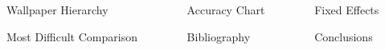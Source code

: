\documentclass[final,hyperref={pdfpagelabels=false}]{beamer}
\begin{document}
\begin{frame}{}
\begin{columns}[t]
    \end{columns}
    \begin{columns}[t]
       \begin{column}{.31\linewidth}
       \begin{block}{Wallpaper Hierarchy}
               	      		 	
               	       		\end{block}
               	       		\begin{block}{Most Difficult Comparison}
               	       		      			
               	       		      		\end{block}
       \end{column}
       	\begin{column}{.40\linewidth}
       		\begin{block}{Accuracy Chart}
      			      			
      		\end{block}
      			\begin{block}{Bibliography}
      		     			
      		     			\renewcommand*{\bibliographytypesize}{\small}
      		     			
      		     		\end{block}
      		
       	\end{column}
       	\begin{column}{.25\linewidth}
      		\begin{block}{Fixed Effects}
   						
     		\end{block}
     		\begin{block}{Conclusions}
     			
     		\end{block}
     	
     	\end{column}
    \end{columns}
  \end{frame}
\end{document}
